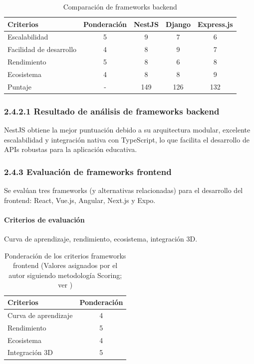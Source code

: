 \begin{table}[ht]
\centering
\caption{Comparación de frameworks backend}
\begin{tabular}{l c c c c}
\hline
Criterios & Ponderación & NestJS & Django & Express.js \\
\hline
Escalabilidad & 5 & 9 & 7 & 6 \\
Facilidad de desarrollo & 4 & 8 & 9 & 7 \\
Rendimiento & 5 & 8 & 6 & 8 \\
Ecosistema & 4 & 8 & 8 & 9 \\
\hline
Puntaje & - & 149 & 126 & 132 \\
\hline
\end{tabular}
\end{table}
\FloatBarrier
\subsubsection{2.4.2.1 Resultado de análisis de frameworks backend}
NestJS obtiene la mejor puntuación debido a su arquitectura modular, excelente escalabilidad y integración nativa con TypeScript, lo que facilita el desarrollo de APIs robustas para la aplicación educativa.

\subsubsection{2.4.3 Evaluación de frameworks frontend}
Se evalúan tres frameworks (y alternativas relacionadas) para el desarrollo del frontend: React, Vue.js, Angular, Next.js y Expo.

\paragraph{Criterios de evaluación}
Curva de aprendizaje, rendimiento, ecosistema, integración 3D.
\begin{table}[ht]
\centering
\caption{Ponderación de los criterios frameworks frontend (Valores asignados por el autor siguiendo metodología Scoring; ver \cite{belton2002})}
\begin{tabular}{l c}
\hline
Criterios & Ponderación \\
\hline
Curva de aprendizaje & 4 \\
Rendimiento & 5 \\
Ecosistema & 4 \\
Integración 3D & 5 \\
\hline
\end{tabular}
\end{table}
\FloatBarrier

